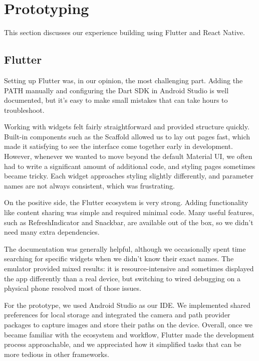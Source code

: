 \section{Prototyping}\label{sec:prototyping}
This section discusses our experience building using Flutter and React Native.


\subsection{Flutter}
Setting up Flutter was, in our opinion, the most challenging part.
Adding the PATH manually and configuring the Dart SDK in Android Studio is well documented, but it’s easy to make small mistakes that can take hours to troubleshoot.

Working with widgets felt fairly straightforward and provided structure quickly.
Built-in components such as the Scaffold allowed us to lay out pages fast, which made it satisfying to see the interface come together early in development.
However, whenever we wanted to move beyond the default Material UI, we often had to write a significant amount of additional code, and styling pages sometimes became tricky.
Each widget approaches styling slightly differently, and parameter names are not always consistent, which was frustrating.

On the positive side, the Flutter ecosystem is very strong.
Adding functionality like content sharing was simple and required minimal code.
Many useful features, such as RefreshIndicator and Snackbar, are available out of the box, so we didn’t need many extra dependencies.

The documentation was generally helpful, although we occasionally spent time searching for specific widgets when we didn’t know their exact names.
The emulator provided mixed results: it is resource-intensive and sometimes displayed the app differently than a real device, but switching to wired debugging on a physical phone resolved most of those issues.

For the prototype, we used Android Studio as our IDE.
We implemented shared preferences for local storage and integrated the camera and path provider packages to capture images and store their paths on the device.
Overall, once we became familiar with the ecosystem and workflow, Flutter made the development process approachable, and we appreciated how it simplified tasks that can be more tedious in other frameworks.

